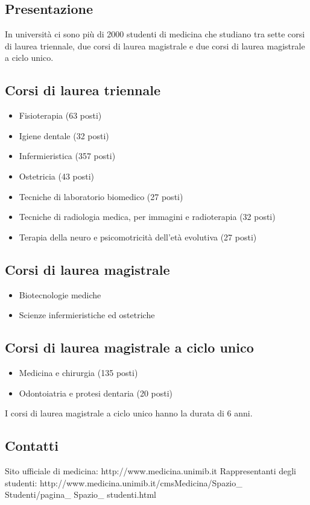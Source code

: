 
\subsection{Presentazione}
In università ci sono più di 2000 studenti di medicina che studiano tra sette corsi di laurea triennale, due corsi di laurea magistrale e due corsi di laurea magistrale a ciclo unico. 

\subsection{Corsi di laurea triennale}

\begin{itemize}
\item Fisioterapia (63 posti) 
\item Igiene dentale (32 posti) 
\item Infermieristica (357 posti) 
\item Ostetricia (43 posti) 
\item Tecniche di laboratorio biomedico (27 posti) 
\item Tecniche di radiologia medica, per immagini e radioterapia (32 posti) 
\item Terapia della neuro e psicomotricità dell'età evolutiva (27 posti) 
\end{itemize}

\subsection{Corsi di laurea magistrale}

\begin{itemize}
\item Biotecnologie mediche 
\item Scienze infermieristiche ed ostetriche
\end{itemize}

\subsection{Corsi di laurea magistrale a ciclo unico}

\begin{itemize}
\item Medicina e chirurgia (135 posti) 
\item Odontoiatria e protesi dentaria (20 posti) 
\end{itemize}
I corsi di laurea magistrale a ciclo unico hanno la durata di 6 anni. 

\subsection{Contatti}
Sito ufficiale di medicina: http://www.medicina.unimib.it 
Rappresentanti degli studenti: http://www.medicina.unimib.it/cmsMedicina/Spazio\_ Studenti/pagina\_ Spazio\_ studenti.html 
